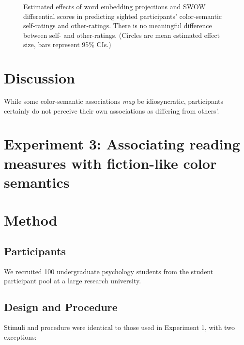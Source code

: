 \documentclass[10pt,letterpaper]{article}
\begin{document}
\begin{figure}[h!]
\begin{center}
\caption{Estimated effects of word embedding projections and SWOW differential scores in predicting sighted participants' color-semantic self-ratings and other-ratings. There is no meaningful difference between self- and other-ratings. (Circles are mean estimated effect size, bars represent 95\% CIs.)}
\label{self_other}
\end{center}
\end{figure}

\section{Discussion}
While some color-semantic associations \emph{may} be idiosyncratic, participants certainly do not perceive their own associations as differing from others'.



\section{Experiment 3: Associating reading measures with fiction-like color semantics}
\section{Method}
\subsection{Participants}
We recruited 100 undergraduate psychology students from the student participant pool at a large research university.
\subsection{Design and Procedure}
Stimuli and procedure were identical to those used in Experiment 1, with two exceptions:
\end{document}
